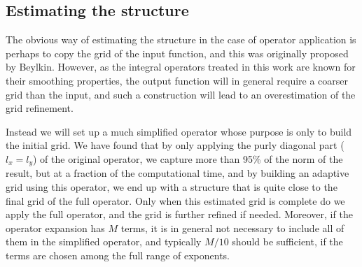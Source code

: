 \subsection{Estimating the \tree structure}
The obvious way of estimating the \tree structure in the case of operator
application is perhaps to copy the grid of the input function, and this
was originally proposed by Beylkin\cite{Beylkin}. However, as the integral
operators treated in this work are known for their smoothing properties, the
output function will in general require a coarser grid than the input, and such
a construction will lead to an overestimation of the grid refinement. 

Instead we 
will set up a much simplified operator whose purpose is only to build the initial 
grid. We have found that by only applying the purly diagonal part ($l_x = l_y$) 
of the original operator, we capture more than 95\% of the norm of the result, 
but at a fraction of the computational time, and by building an adaptive grid using
this operator, we end up with a \tree structure that is quite close to the final 
grid of the full operator. Only when this estimated grid is complete do we apply the
full operator, and the grid is further refined if needed. Moreover, if the operator
expansion has $M$ terms, it is in general not necessary to include all of
them in the simplified operator, and typically $M/10$ should be sufficient,
if the terms are chosen among the full range of exponents.
